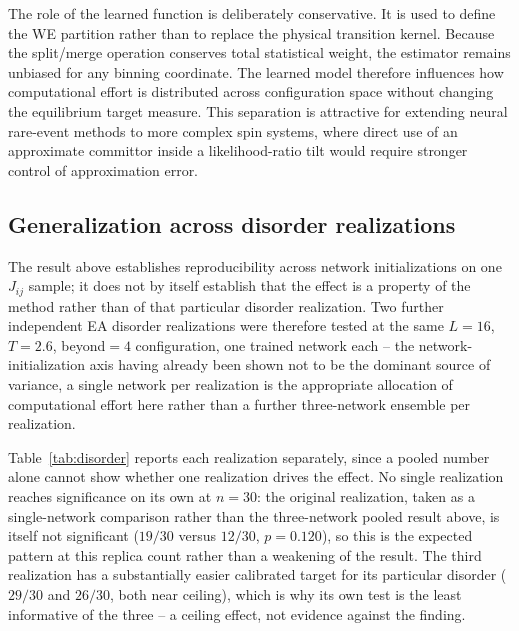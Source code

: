 \documentclass[a4paper,fleqn]{cas-sc}
\begin{document}
The role of the learned function is deliberately conservative. It is used to define the WE
partition rather than to replace the physical transition kernel. Because the split/merge
operation conserves total statistical weight, the estimator remains unbiased for any binning
coordinate. The learned model therefore influences how computational effort is distributed
across configuration space without changing the equilibrium target measure. This separation is
attractive for extending neural rare-event methods to more complex spin systems, where direct
use of an approximate committor inside a likelihood-ratio tilt would require stronger control
of approximation error.

\subsection{Generalization across disorder realizations}\label{sec:disordergen}
The result above establishes reproducibility across network initializations on one $J_{ij}$
sample; it does not by itself establish that the effect is a property of the method rather than
of that particular disorder realization. Two further independent EA disorder realizations were
therefore tested at the same $L=16$, $T=2.6$, beyond$=4$ configuration, one trained network
each -- the network-initialization axis having already been shown not to be the dominant source
of variance, a single network per realization is the appropriate allocation of computational
effort here rather than a further three-network ensemble per realization.

Table~\ref{tab:disorder} reports each realization separately, since a pooled number alone
cannot show whether one realization drives the effect. No single realization reaches
significance on its own at $n=30$: the original realization, taken as a single-network
comparison rather than the three-network pooled result above, is itself not significant
($19/30$ versus $12/30$, $p=0.120$), so this is the expected pattern at this replica count
rather than a weakening of the result. The third realization has a substantially easier
calibrated target for its particular disorder ($29/30$ and $26/30$, both near ceiling), which
is why its own test is the least informative of the three -- a ceiling effect, not evidence
against the finding.
\end{document}
